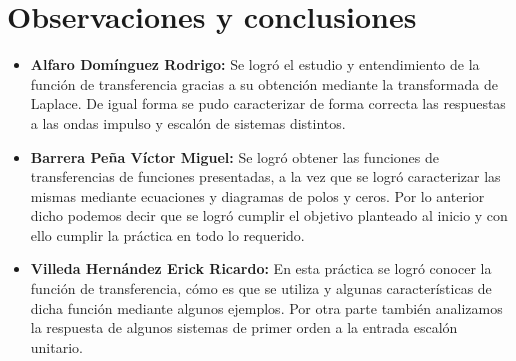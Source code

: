 \section{Observaciones y conclusiones}

\begin{itemize}
	\item \textbf{Alfaro Domínguez Rodrigo:}
	Se logró el estudio y entendimiento de la función de transferencia gracias a su obtención mediante la transformada de Laplace. De igual forma se pudo caracterizar de forma correcta las respuestas a las ondas impulso y escalón de sistemas distintos.
	\item \textbf{Barrera Peña Víctor Miguel:} Se logró obtener las funciones de transferencias de funciones presentadas, a la vez que se logró caracterizar las mismas mediante ecuaciones y diagramas de polos y ceros. Por lo anterior dicho podemos decir que se logró cumplir el objetivo planteado al inicio y con ello cumplir la práctica en todo lo requerido.
	\item \textbf{Villeda Hernández Erick Ricardo:}
	En esta práctica se logró conocer la función de transferencia, cómo es que se utiliza y algunas características de dicha función mediante algunos ejemplos. Por otra parte también analizamos la respuesta de algunos sistemas de primer orden a la entrada escalón unitario.
\end{itemize}